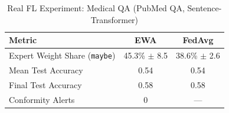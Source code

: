 \begin{table}[h]
\centering
\caption{Real FL Experiment: Medical QA (PubMed QA, Sentence-Transformer)}
\label{tab:medical_real}
\begin{tabular}{lcc}
\toprule
Metric & EWA & FedAvg \\
\midrule
Expert Weight Share (\texttt{maybe}) & 45.3\% $\pm$ 8.5 & 38.6\% $\pm$ 2.6 \\
Mean Test Accuracy & 0.54 & 0.54 \\
Final Test Accuracy & 0.58 & 0.58 \\
Conformity Alerts & 0 & — \\
\bottomrule
\end{tabular}
\end{table}
